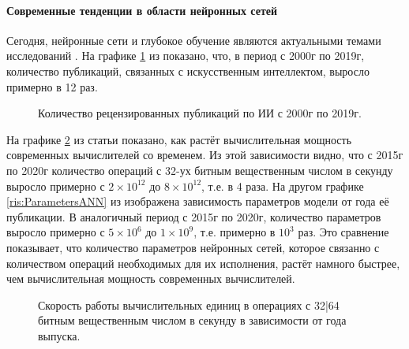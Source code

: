 \paragraph{Современные тенденции в области нейронных сетей}
\par
Сегодня, нейронные сети и глубокое обучение являются актуальными темами исследований \cite{zhang2021ai}. На графике \ref{ris:PublicationsAI} из \cite{zhang2021ai} показано, что, в период с 2000г по 2019г, количество публикаций, связанных с искусственным интеллектом, выросло примерно в 12 раз.
\begin{figure}[h!]
	\caption{Количество рецензированных публикаций по ИИ с 2000г по 2019г.}
	\label{ris:PublicationsAI}
\end{figure}
На графике \ref{ris:PerfomanceGPUCPU} из статьи \cite{sun2019summarizing} показано, как растёт вычислительная мощность современных вычислителей со временем. Из этой зависимости видно, что с 2015г по 2020г количество операций с 32-ух битным вещественным числом в секунду выросло примерно с $2\times10^{12}$ до $8\times10^{12}$, т.е. в 4 раза. На другом графике \ref{ris:ParametersANN} из \cite{bernstein2021freely} изображена зависимость параметров модели от года её публикации. В аналогичный период с 2015г по 2020г, количество параметров выросло примерно с $5\times10^{6}$ до $1\times10^{9}$, т.е. примерно в $10^{3}$ раз. Это сравнение показывает, что количество параметров нейронных сетей, которое связанно с количеством операций необходимых для их исполнения, растёт намного быстрее, чем вычислительная мощность современных вычислителей.
\begin{figure}[h!]
	\caption{Скорость работы вычислительных единиц в операциях с 32|64 битным вещественным числом в секунду в зависимости от года выпуска.}
	\label{ris:PerfomanceGPUCPU}
\end{figure}

